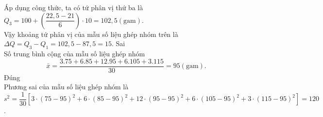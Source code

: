 \begin{ex}
{\begin{itemchoice}
			Áp dụng công thức, ta có tứ phân vị thứ ba là $Q_3=100+\left(\dfrac{22,5-21}{6}\right) \cdot 10=102,5(\mathrm{gam})$.\\
			Vậy khoảng tứ phân vị của mẫu số liệu ghép nhóm trên là $\Delta Q=Q_3-Q_1=102,5-87,5=15$.	
			\itemch Sai\\
			Số trung bình cộng của mẫu số liệu ghép nhóm
			$$
			\bar{x}=\dfrac{3.75+6.85+12.95+6.105+3.115}{30}=95(\mathrm{gam}).
			$$
			\itemch Đúng\\
			Phương sai của mẫu số liệu ghép nhóm là
			$$
			s^2=\dfrac{1}{30}\left[3 \cdot(75-95)^2+6 \cdot(85-95)^2+12 \cdot(95-95)^2+6 \cdot(105-95)^2+3 \cdot(115-95)^2\right]=120
			$$.
		\end{itemchoice}
	}
\end{ex}

\begin{ex}%


\end{ex}
